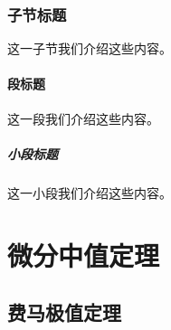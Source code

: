 \documentclass[printbox]{BHCexam}
\begin{document}
\subsubsection{子节标题}这一子节我们介绍这些内容。
\paragraph{段标题}这一段我们介绍这些内容。
\subparagraph{小段标题}这一小段我们介绍这些内容。

\section{微分中值定理}

\subsection{费马极值定理}

\notice
\end{document}
